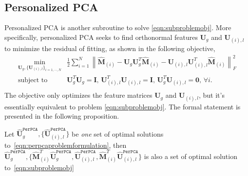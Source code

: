 \documentclass[twoside,11pt]{article}
\def\perpca{\texttt{PerPCA}\xspace}
\newcommand{\norm}[1]{\left\lVert#1\right\rVert}
\newcommand{\matI}{\mathbf{I}}
\newcommand{\matU}{\mathbf{U}}
\newcommand{\hmatM}{\hat{\mathbf{M}}}
\newcommand{\hmatU}{\hat{\mathbf{U}}}
\begin{document}
\subsection{Personalized PCA}
Personalized PCA \citep{personalizedpca} is another subroutine to solve \eqref{eqn:subproblemobj}. More specifically, personalized PCA seeks to find orthonormal features $\matU_g$ and $\matU_{(i),l}$ to minimize the residual of fitting, as shown in the following objective,
\begin{equation}
\label{eqn:perpcaproblemformulation}
\begin{aligned}
\min_{\matU_g,\{\matU_{(i),l}\}_{i=1,\cdots,N}}& \frac{1}{2}\sum_{i=1}^N\norm{\hmatM_{(i)}-\matU_g\matU_g^T\hmatM_{(i)}-\matU_{(i),l}\matU_{(i),l}^T\hmatM_{(i)}}_F^2\\
\text{subject to  }&  
\matU_g^T\matU_g=\matI,\, \matU_{(i),l}^T\matU_{(i),l}=\matI,\,  \matU_g^T\matU_{(i),l}=\bm{0},\, \forall i. \\
\end{aligned}
\end{equation}
The objective only optimizes the feature matrices $\matU_g$ and $\matU_{(i),l}$, but it's essentially equivalent to problem \eqref{eqn:subproblemobj}. The formal statement is presented in the following proposition.

\begin{proposition}
Let $\hmatU_g^{\perpca},\{\hmatU^{\perpca}_{(i),l}\}$ be \textit{one} set of optimal solutions to~\eqref{eqn:perpcaproblemformulation}, then $\hmatU_g^{\perpca},\{\hmatM_{(i)}^T\hmatU_g^{\perpca},\hmatU^{\perpca}_{(i),l}, \hmatM_{(i)}^T\hmatU_{(i),l}^{\perpca}\}$ is also a set of optimal solution to~\eqref{eqn:subproblemobj}
\end{proposition}
\end{document}

